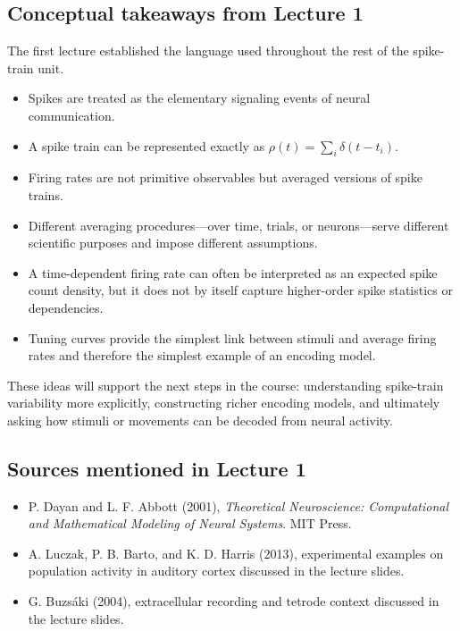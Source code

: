 \documentclass[11pt]{article}
\begin{document}
\subsection{Conceptual takeaways from Lecture 1}

The first lecture established the language used throughout the rest of the spike-train unit.

\begin{itemize}
    \item Spikes are treated as the elementary signaling events of neural communication.
    \item A spike train can be represented exactly as $\rho(t)=\sum_i \delta(t-t_i)$.
    \item Firing rates are not primitive observables but averaged versions of spike trains.
    \item Different averaging procedures---over time, trials, or neurons---serve different scientific purposes and impose different assumptions.
    \item A time-dependent firing rate can often be interpreted as an expected spike count density, but it does not by itself capture higher-order spike statistics or dependencies.
    \item Tuning curves provide the simplest link between stimuli and average firing rates and therefore the simplest example of an encoding model.
\end{itemize}

These ideas will support the next steps in the course: understanding spike-train variability more explicitly, constructing richer encoding models, and ultimately asking how stimuli or movements can be decoded from neural activity.

\subsection*{Sources mentioned in Lecture 1}

\begin{itemize}
    \item P. Dayan and L. F. Abbott (2001), \emph{Theoretical Neuroscience: Computational and Mathematical Modeling of Neural Systems}. MIT Press.
    \item A. Luczak, P. B. Barto, and K. D. Harris (2013), experimental examples on population activity in auditory cortex discussed in the lecture slides.
    \item G. Buzs\'aki (2004), extracellular recording and tetrode context discussed in the lecture slides.
\end{itemize}
\end{document}
